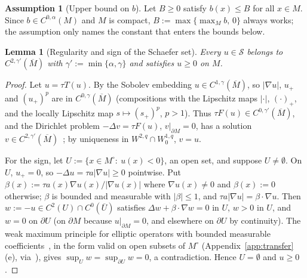 \documentclass[11pt]{article}
\theoremstyle{plain}
\newtheorem{lemma}[theorem]{Lemma}
\theoremstyle{definition}
\newtheorem{assumption}[theorem]{Assumption}
\theoremstyle{remark}
\begin{document}
\begin{assumption}[Upper bound on \(b\)]\label{assump:bupper}
Let \(B\ge 0\) satisfy \(b(x)\le B\) for all \(x\in M\). Since \(b\in C^{0,\alpha}(M)\) and \(M\) is compact, \(B:=\max\{\max_M b,\,0\}\) always works; the assumption only names the constant that enters the bounds below.
\end{assumption}

\begin{lemma}[Regularity and sign of the Schaefer set]\label{lem:schaeferSign}
Every \(u\in\mathcal S\) belongs to \(C^{2,\gamma'}(\overline M)\) with \(\gamma':=\min\{\alpha,\gamma\}\) and satisfies \(u\ge 0\) on \(M\).
\end{lemma}
\begin{proof}
Let \(u=\tau T(u)\). By the Sobolev embedding \(u\in C^{1,\gamma}(\overline M)\), so \(|\nabla u|\), \(u_+\) and \((u_+)^p\) are in \(C^{0,\gamma}(\overline M)\) (compositions with the Lipschitz maps \(|\cdot|\), \((\cdot)_+\), and the locally Lipschitz map \(s\mapsto (s_+)^p\), \(p>1\)). Thus \(\tau F(u)\in C^{0,\gamma'}(\overline M)\), and the Dirichlet problem \(-\Delta v=\tau F(u)\), \(v|_{\partial M}=0\), has a solution \(v\in C^{2,\gamma'}(\overline M)\)~\cite[Thm.~6.14]{GilbargTrudinger2001}; by uniqueness in \(W^{2,q}\cap W^{1,q}_0\), \(v=u\).

For the sign, let \(U:=\{x\in M^\circ:\ u(x)<0\}\), an open set, and suppose \(U\ne\emptyset\). On \(U\), \(u_+=0\), so \(-\Delta u=\tau a|\nabla u|\ge 0\) pointwise. Put \(\beta(x):=\tau a(x)\nabla u(x)/|\nabla u(x)|\) where \(\nabla u(x)\ne 0\) and \(\beta(x):=0\) otherwise; \(\beta\) is bounded and measurable with \(|\beta|\le 1\), and \(\tau a|\nabla u|=\beta\cdot\nabla u\). Then \(w:=-u\in C^2(U)\cap C^0(\overline U)\) satisfies \(\Delta w+\beta\cdot\nabla w=0\) in \(U\), \(w>0\) in \(U\), and \(w=0\) on \(\partial U\) (on \(\partial M\) because \(u|_{\partial M}=0\), and elsewhere on \(\partial U\) by continuity). The weak maximum principle for elliptic operators with bounded measurable coefficients~\cite[Thm.~3.1]{GilbargTrudinger2001}, in the form valid on open subsets of \(M^\circ\) (Appendix~\ref{app:transfer}(e), via~\cite[Thm.~3.5]{GilbargTrudinger2001}), gives \(\sup_U w=\sup_{\partial U}w=0\), a contradiction. Hence \(U=\emptyset\) and \(u\ge 0\).
\end{proof}
\end{document}
